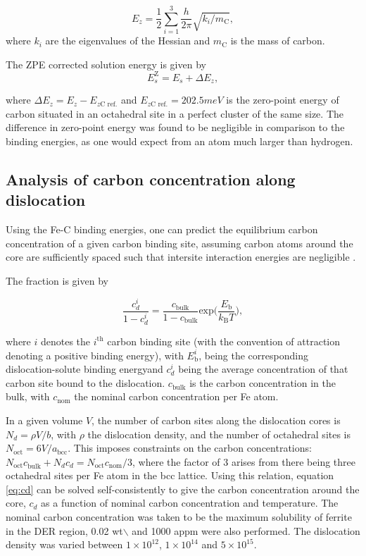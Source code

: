 \documentclass[a4paper,11pt]{article}
\begin{document}
\[ E_z = \frac{1}{2} \sum_{i=1}^3 \frac{h}{2\pi} \sqrt{ k_i /
    m_{\text{C}} },  \]
where \(k_i\) are the eigenvalues of the Hessian and \(m_\text{C}\) is
the mass of carbon. 

The ZPE corrected solution energy is given by 
\[ E^{\text{Z}}_{s} = E_s + \Delta E_z,  \]

where \(\Delta E_z = E_z - E_{z\text{C ref.}}\) and \(E_{z\text{C ref.}} = 202.5 meV\) is the zero-point energy of carbon
situated in an octahedral site in a perfect cluster of the same size. The difference in
zero-point energy was found to be negligible in comparison to the binding energies, as one would
expect from an atom much larger than hydrogen. 

\subsection{Analysis of carbon concentration along dislocation}
\label{sec:org2a6b7f3}

Using the Fe-C binding energies, one can predict the equilibrium carbon concentration of a given carbon
binding site, assuming carbon atoms around the core are sufficiently spaced such that intersite
interaction energies are negligible \cite{Ventelon2015}.

The fraction is given by 

\[  \frac{ c_d^{i} }{1 -  c_d^{i} } = \frac{ c_{\text{bulk}}^{} }{1 - c_{\text{bulk}} } \text{exp} \Big( 
    \frac{E_{\text{b}} }{k_{\text{B}}T}  \Big),     \label{eq:cd}\]


where \(i\) denotes the \(i^{\text{th}}\) carbon binding site (with the convention of attraction
denoting a positive binding energy), with \(E_{\text{b}}^{i}\), being the
corresponding dislocation-solute binding energyand \(c_d^{i}\) being the average concentration of that carbon
site bound to the dislocation. \(c_{\text{bulk}}^{}\) is the carbon concentration in the bulk, with
\(c_{\text{nom}}^{}\) the nominal carbon concentration per Fe atom.


In a given volume \(V\), the number of carbon sites along the dislocation cores is \(N_d = \rho V/b\),
with \(\rho\) the dislocation density, and the number of octahedral sites is \(N_{\text{oct}} =
    6V/a_{\text{bcc}}\). This imposes constraints on the carbon concentrations: \(N_{\text{oct}}
    c_{\text{bulk}}^{} + N_d c_d = N_{\text{oct}} c_{\text{nom}}/3\), where the factor of 3 arises from there being
three octahedral sites per Fe atom in the bcc lattice. Using this relation, equation \ref{eq:cd} can be solved
self-consistently to give the carbon concentration around the core, \(c_d\) as a function of
nominal carbon concentration and temperature. The nominal carbon concentration was taken to be
the maximum solubility of ferrite in the DER region, 0.02 wt$\backslash$%
and 1000 appm were also performed. The dislocation
density was varied between \(1\times10^{12}\), \(1\times10^{14}\) and \(5\times10^{15}\).
\end{document}
